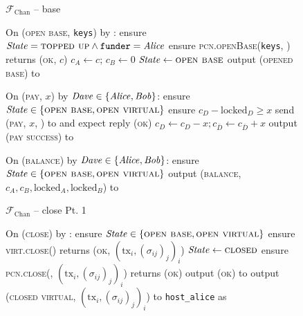 \begin{figure}[H]
  \begin{systembox}{$\mathcal{F}_{\mathrm{Chan}}$ -- base}
    \begin{algorithmic}[1]
      \State On (\textsc{open base}, \texttt{keys}) by \alice:
      \Indent
        \State ensure $\mathit{State} = \textsc{topped up} \wedge
        \mathtt{funder} = \mathit{Alice}$
        \State ensure \textsc{pcn.openBase}(\texttt{keys}, \bob) returns
        (\textsc{ok}, $c$)
        \State $c_A \gets c$; $c_B \gets 0$
        \State $\mathit{State} \gets \textsc{open base}$
        \State output (\textsc{opened base}) to \alice
      \EndIndent
      \Statex

      \State On (\textsc{pay}, $x$) by $\mathit{Dave} \in \{\mathit{Alice}, \mathit{Bob}\}$:
      \Indent
        \State ensure $\mathit{State} \in \{\textsc{open base}, \textsc{open
        virtual}\}$
        \State ensure $c_D - \mathrm{locked}_D \geq x$
        \State send (\textsc{pay}, $x$, \dave) to \adversary and expect reply
        (\textsc{ok}) 
        \State $c_D \gets c_D - x; c_{\bar{D}} \gets c_{\bar{D}} + x$
        \State output (\textsc{pay success}) to \dave
      \EndIndent
      \Statex

      \State On (\textsc{balance}) by $\mathit{Dave} \in \{\mathit{Alice}, \mathit{Bob}\}$:
      \Indent
        \State ensure $\mathit{State} \in \{\textsc{open base}, \textsc{open
        virtual}\}$
        \State output (\textsc{balance}, $c_A, c_B, \mathrm{locked}_A,
        \mathrm{locked}_B$) to \dave
      \EndIndent
    \end{algorithmic}
  \end{systembox}
  \caption{}
  \label{code:functionality:chan:skeleton:base}
\end{figure}

\begin{figure}[H]
  \begin{systembox}{$\mathcal{F}_{\mathrm{Chan}}$ -- close Pt. 1}
    \begin{algorithmic}[1]
      \State On (\textsc{close}) by \alice:
      \Indent
        \State ensure $\mathit{State} \in \{\textsc{open base}, \textsc{open
        virtual}\}$
        \State ensure \textsc{virt.close}(\alice) returns (\textsc{ok},
        $(\mathrm{tx}_i, (\sigma_{ij})_j)_i$) 
        \State $\mathit{State} \gets \textsc{closed}$
          \State ensure \textsc{pcn.close}(\alice, $(\mathrm{tx}_i,
          (\sigma_{ij})_j)_i$) returns (\textsc{ok})
          \State output (\textsc{ok}) to \alice
        \Else \: 
          \State output (\textsc{closed virtual}, $(\mathrm{tx}_i,
          (\sigma_{ij})_j)_i$) to \texttt{host\_alice} as \alice
        \EndIf
      \EndIndent
    \end{algorithmic}
  \end{systembox}
  \caption{}
  \label{code:functionality:chan:skeleton:close:pt1}
\end{figure}

